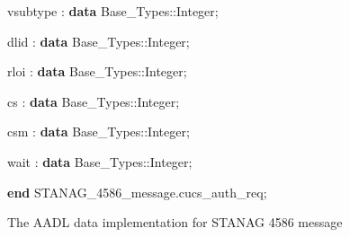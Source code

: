 \begin{figure}
{{vsubtype : {\color{color18} \textbf{data}} Base\_Types::Integer;      

dlid : {\color{color18} \textbf{data}} Base\_Types::Integer;      

rloi : {\color{color18} \textbf{data}} Base\_Types::Integer;      

cs : {\color{color18} \textbf{data}} Base\_Types::Integer;      

csm : {\color{color18} \textbf{data}} Base\_Types::Integer;      

wait : {\color{color18} \textbf{data}} Base\_Types::Integer;  

\parindent=0pt
{\color{color18} \textbf{end}} STANAG\_4586\_message.cucs\_auth\_req;

}%
}
\caption{The AADL data implementation for STANAG 4586 message}
\label{fig:stanag-data}
\end{figure}